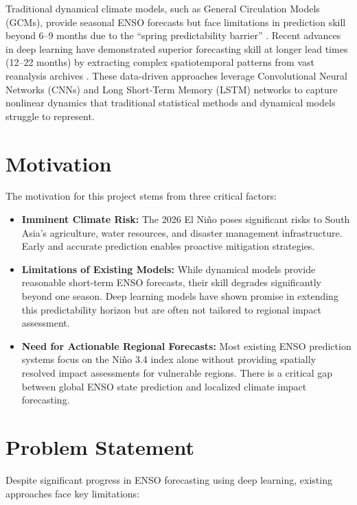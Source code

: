 Traditional dynamical climate models, such as General Circulation Models (GCMs), provide seasonal ENSO forecasts but face limitations in prediction skill beyond 6--9 months due to the ``spring predictability barrier'' \cite{dijkstra2019deep}. Recent advances in deep learning have demonstrated superior forecasting skill at longer lead times (12--22 months) by extracting complex spatiotemporal patterns from vast reanalysis archives \cite{ham2019deep, mahesh2024physics}. These data-driven approaches leverage Convolutional Neural Networks (CNNs) and Long Short-Term Memory (LSTM) networks to capture nonlinear dynamics that traditional statistical methods and dynamical models struggle to represent.

\section{Motivation}
The motivation for this project stems from three critical factors:

\begin{itemize}
    \item \textbf{Imminent Climate Risk:} The 2026 El Ni\~{n}o poses significant risks to South Asia's agriculture, water resources, and disaster management infrastructure. Early and accurate prediction enables proactive mitigation strategies.
    
    \item \textbf{Limitations of Existing Models:} While dynamical models provide reasonable short-term ENSO forecasts, their skill degrades significantly beyond one season. Deep learning models have shown promise in extending this predictability horizon but are often not tailored to regional impact assessment.
    
    \item \textbf{Need for Actionable Regional Forecasts:} Most existing ENSO prediction systems focus on the Ni\~{n}o 3.4 index alone without providing spatially resolved impact assessments for vulnerable regions. There is a critical gap between global ENSO state prediction and localized climate impact forecasting.
\end{itemize}

\section{Problem Statement}
Despite significant progress in ENSO forecasting using deep 
learning, existing approaches face key limitations:

